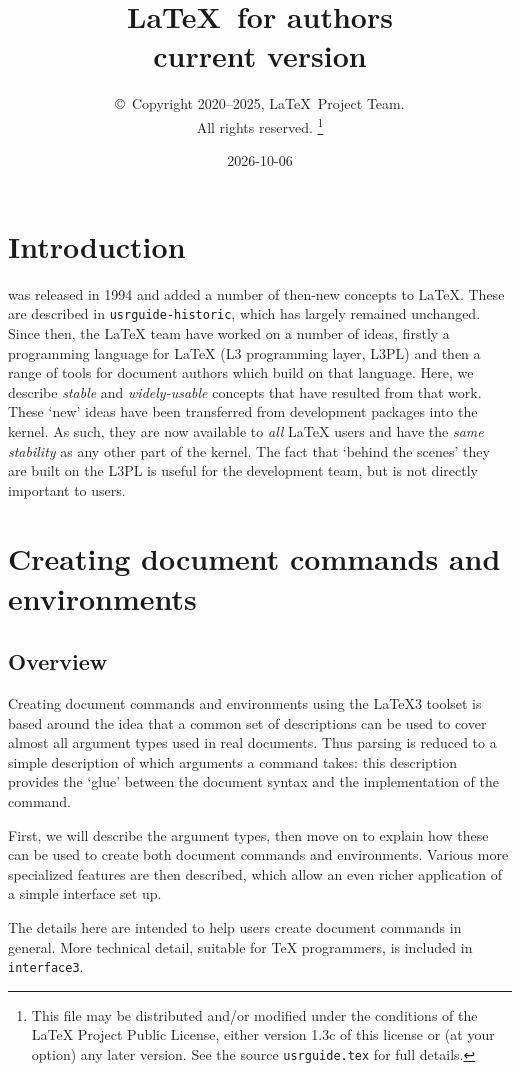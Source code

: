 \documentclass{ltxguide}
\title{\LaTeX\ for authors\\ current version}
\author{\copyright~Copyright 2020--2025, \LaTeX\ Project Team.\\
   All rights reserved.%
   \footnote{This file may be distributed and/or modified under the
     conditions of the \LaTeX{} Project Public License, either version 1.3c
     of this license or (at your option) any later version. See the source
    \texttt{usrguide.tex} for full details.}%
}
\date{2026-10-06}
\begin{document}
\maketitle

\tableofcontents

\section{Introduction}

\LaTeXe{} was released in 1994 and added a number of then-new concepts to
\LaTeX{}. These are described in \texttt{usrguide-historic}, which has largely remained
unchanged. Since then, the \LaTeX{} team have worked on a number of ideas,
firstly a programming language for \LaTeX{} (L3 programming layer, L3PL) and then a range of
tools for document authors which build on that language. Here, we describe
\emph{stable} and \emph{widely-usable} concepts that have resulted from that
work. These `new' ideas have been transferred from development packages
into the \LaTeXe{} kernel. As such, they are now available to \emph{all}
\LaTeX{} users and have the \emph{same stability} as any other part of the
kernel. The fact that `behind the scenes' they are built on the L3PL
is useful for the development team, but is not directly important to users.

\section{Creating document commands and environments}

\subsection{Overview}

Creating document commands and environments using the \LaTeX3 toolset is based
around the idea that a common set of descriptions can be used to cover almost
all argument types used in real documents. Thus parsing is reduced to a simple
description of which arguments a command takes: this description provides the
`glue' between the document syntax and the implementation of the
command.

First, we will describe the argument types, then move on to explain how these
can be used to create both document commands and environments. Various more
specialized features are then described, which allow an even richer application
of a simple interface set up.

The details here are intended to help users create document commands in
general. More technical detail, suitable for \TeX{} programmers, is included
in \texttt{interface3}.
\end{document}
